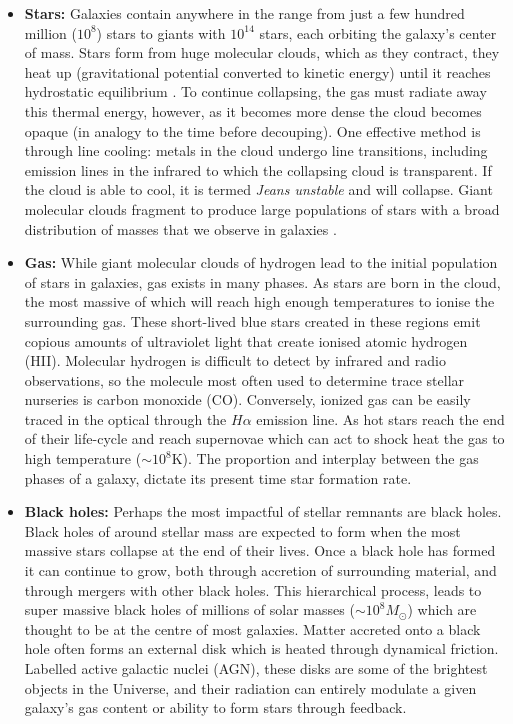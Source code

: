 \begin{itemize}
    \item \textbf{Stars:} Galaxies contain anywhere in the range from just a few hundred million ($10^8$) stars to giants with $10^{14}$ stars, each orbiting the galaxy's center of mass. Stars form from huge molecular clouds, which as they contract, they heat up (gravitational potential converted to kinetic energy) until it reaches hydrostatic equilibrium \citep{jeans1902}. To continue collapsing, the gas must radiate away this thermal energy, however, as it becomes more dense the cloud becomes opaque (in analogy to the time before decouping). One effective method is through line cooling: metals in the cloud undergo line transitions, including emission lines in the infrared to which the collapsing cloud is transparent. If the cloud is able to cool, it is termed \textit{Jeans unstable} and will collapse. Giant molecular clouds fragment to produce large populations of stars with a broad distribution of masses that we observe in galaxies \citep[e.g.][]{kroupa2001}.
    
    \item \textbf{Gas:} While giant molecular clouds of hydrogen lead to the initial population of stars in galaxies, gas exists in many phases. As stars are born in the cloud, the most massive of which will reach high enough temperatures to ionise the surrounding gas. These short-lived blue stars created in these regions emit copious amounts of ultraviolet light that create ionised atomic hydrogen (HII). Molecular hydrogen is difficult to detect by infrared and radio observations, so the molecule most often used to determine trace stellar nurseries is carbon monoxide (CO). Conversely, ionized gas can be easily traced in the optical through the $H\alpha$ emission line. As hot stars reach the end of their life-cycle and reach supernovae which can act to shock heat the gas to high temperature ($\sim 10^{8}$K). The proportion and interplay between the gas phases of a galaxy, dictate its present time star formation rate.
    
    \item \textbf{Black holes:} Perhaps the most impactful of stellar remnants are black holes. Black holes of around stellar mass are expected to form when the most massive stars collapse at the end of their lives. Once a black hole has formed it can continue to grow, both through accretion of surrounding material, and through mergers with other black holes. This hierarchical process, leads to super massive black holes of millions of solar masses ($\sim 10^8 M_{\odot}$) which are thought to be at the centre of most galaxies. Matter accreted onto a black hole often forms an external disk which is heated through dynamical friction. Labelled active galactic nuclei (AGN), these disks are some of the brightest objects in the Universe, and their radiation can entirely modulate a given galaxy's gas content or ability to form stars through feedback.
    

\end{itemize}
